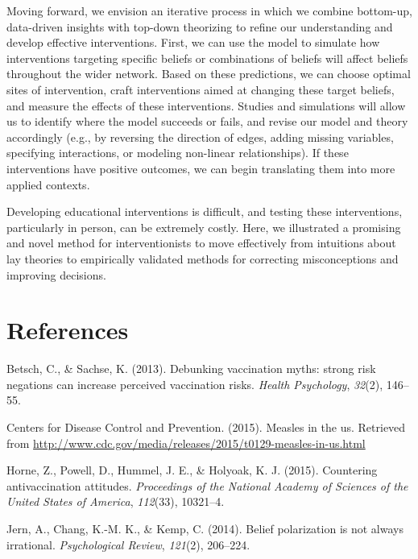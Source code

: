\documentclass[10pt, letterpaper]{article}
\begin{document}
Moving forward, we envision an iterative process in which we combine
bottom-up, data-driven insights with top-down theorizing to refine our
understanding and develop effective interventions. First, we can use the
model to simulate how interventions targeting specific beliefs or
combinations of beliefs will affect beliefs throughout the wider
network. Based on these predictions, we can choose optimal sites of
intervention, craft interventions aimed at changing these target
beliefs, and measure the effects of these interventions. Studies and
simulations will allow us to identify where the model succeeds or fails,
and revise our model and theory accordingly (e.g., by reversing the
direction of edges, adding missing variables, specifying interactions,
or modeling non-linear relationships). If these interventions have
positive outcomes, we can begin translating them into more applied
contexts.

Developing educational interventions is difficult, and testing these
interventions, particularly in person, can be extremely costly. Here, we
illustrated a promising and novel method for interventionists to move
effectively from intuitions about lay theories to empirically validated
methods for correcting misconceptions and improving decisions.

\section{References}\label{references}

\setlength{\parindent}{-0.1in} \setlength{\leftskip}{0.125in} \noindent

\hypertarget{refs}{}
\hypertarget{ref-Betsch2013}{}
Betsch, C., \& Sachse, K. (2013). Debunking vaccination myths: strong
risk negations can increase perceived vaccination risks. \emph{Health
Psychology}, \emph{32}(2), 146--55.

\hypertarget{ref-CDC2015}{}
Centers for Disease Control and Prevention. (2015). Measles in the us.
Retrieved from
\url{http://www.cdc.gov/media/releases/2015/t0129-measles-in-us.html}

\hypertarget{ref-Horne2015}{}
Horne, Z., Powell, D., Hummel, J. E., \& Holyoak, K. J. (2015).
Countering antivaccination attitudes. \emph{Proceedings of the National
Academy of Sciences of the United States of America}, \emph{112}(33),
10321--4.

\hypertarget{ref-Jern2014}{}
Jern, A., Chang, K.-M. K., \& Kemp, C. (2014). Belief polarization is
not always irrational. \emph{Psychological Review}, \emph{121}(2),
206--224.
\end{document}
